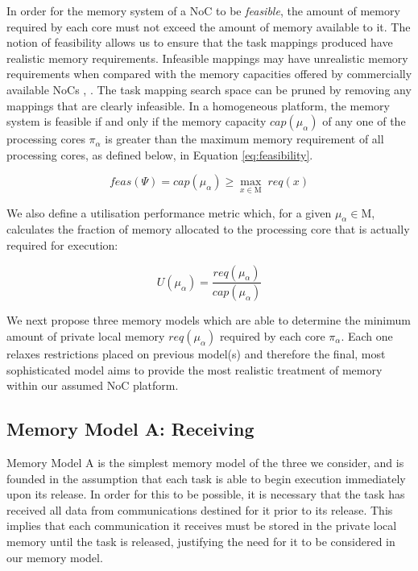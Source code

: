 \documentclass[conference]{IEEEtran}
\begin{document}
In order for the memory system of a NoC to be \textit{feasible}, the amount of memory required by each core must not exceed the amount of memory available to it. The notion of feasibility allows us to ensure that the task mappings produced have realistic memory requirements. Infeasible mappings may have unrealistic memory requirements when compared with the memory capacities offered by commercially available NoCs \cite{de_dinechin_guaranteed_2014}, \cite{agarwal_tile_2007}. The task mapping search space can be pruned by removing any mappings that are clearly infeasible. In a homogeneous platform, the memory system is feasible if and only if the memory capacity $cap(\mu_\alpha)$ of any one of the processing cores $\pi_\alpha$ is greater than the maximum memory requirement of all processing cores, as defined below, in Equation \ref{eq:feasibility}.
\vspace{-1ex}

	\begin{equation}
		feas(\Psi)  = cap(\mu_\alpha) \geq \max_{x \in \mathrm{M}}\phantom{.}{req(x)}
		\label{eq:feasibility}
	\end{equation}
	 
We also define a utilisation performance metric which, for a given $\mu_\alpha \in \mathrm{M}$, calculates the fraction of memory allocated to the processing core that is actually required for execution:
\vspace{-0.5ex}

	\begin{equation}
		U(\mu_\alpha) = \frac{req(\mu_\alpha)}{cap(\mu_\alpha)}
		\label{eq:util_memory}
	\end{equation}

We next propose three memory models which are able to determine the minimum amount of private local memory $req(\mu_\alpha)$ required by each core $\pi_\alpha$. Each one relaxes restrictions placed on previous model(s) and therefore the final, most sophisticated model aims to provide the most realistic treatment of memory within our assumed NoC platform.

\subsection{Memory Model A: Receiving}\label{memory_model_a}

Memory Model A is the simplest memory model of the three we consider, and is founded in the assumption that each task is able to begin execution immediately upon its release. In order for this to be possible, it is necessary that the task has received all data from communications destined for it prior to its release. This implies that each communication it receives must be stored in the private local memory until the task is released, justifying the need for it to be considered in our memory model.
	
\end{document}
